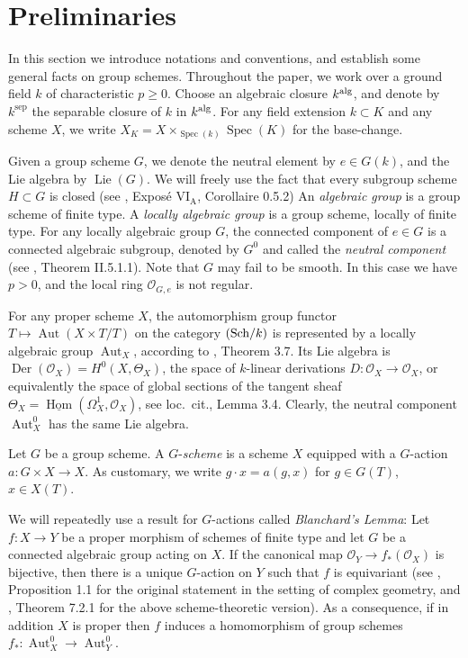 \documentclass[oneside, 12pt]{amsart}
\theoremstyle{definition}
\theoremstyle{remark}
\newcommand{\catO}{\mathcal{O}}
\newcommand{\alg}{\text{\rm alg}}
\newcommand{\Aut}{\operatorname{Aut}}
\newcommand{\Der}{\operatorname{Der}}
\newcommand{\Gal}{\operatorname{Gal}}
\newcommand{\Lie}{\operatorname{Lie}}
\renewcommand{\O}{\mathscr{O}}
\newcommand{\ra}{\rightarrow}
\newcommand{\sep}{{\operatorname{sep}}}
\newcommand{\Sch}{\text{\rm Sch}}
\newcommand{\Spec}{\operatorname{Spec}}
\newcommand{\uHom}{\underline{\operatorname{Hom}}}
\begin{document}
\section{Preliminaries}
\label{sec:prel}

In this section we introduce notations and conventions, and establish
some general facts on group schemes. Throughout the paper, 
we work over a ground field $k$ of characteristic $p\geq 0$.
Choose an algebraic closure $k^{\alg}$,
and denote by $k^{\sep}$ the separable closure
of $k$ in $k^{\alg}$.
For any field extension $k\subset K$ and any  scheme $X$, we write 
$X_K=X \times_{\Spec(k)} \Spec(K)$ for the base-change.

Given a group scheme $G$, we denote the
neutral element by $e  \in G(k)$,
and the Lie algebra by $\Lie(G)$.
We will freely use the fact that every
subgroup scheme  $H\subset G$ is closed
(see \cite{SGA 3a}, Expos\'e $\text{VI}_\text{A}$,  Corollaire 0.5.2)
An \emph{algebraic group} is a group scheme
of finite type. A \emph{locally algebraic group} 
is a group scheme, locally of finite type. 
For any locally algebraic group $G$, the connected 
component of $e\in G$ is a connected algebraic subgroup, 
denoted by $G^0$ and called the \emph{neutral component} 
(see \cite {Demazure; Gabriel 1970}, Theorem II.5.1.1).
Note that $G$ may fail to be smooth. In this case we have  $p>0$,
and the local ring $\O_{G,e}$ is not regular.

For any proper scheme $X$, the automorphism group
functor $T \mapsto \Aut(X \times T/T)$ on the category $(\Sch/k)$ is represented
by a locally algebraic group $\Aut_X$, according to 
\cite{Matsumura; Oort 1967}, Theorem 3.7. Its Lie algebra is  
$\Der(\catO_X)=H^0(X,\Theta_X)$, the space of $k$-linear 
derivations $D :\O_X\ra \O_X$,
or equivalently the space of global sections of the tangent sheaf $\Theta_X=\uHom(\Omega^1_X,\O_X)$,
see loc.~cit., Lemma 3.4. 
Clearly, the neutral component $\Aut^0_X$ has the same Lie algebra.

Let $G$ be a group scheme. A $G$-\emph{scheme} 
is a scheme $X$ equipped with a $G$-action 
$a : G \times X \to X$.
As customary, we write $ g\cdot x= a(g,x) $  for  
$g \in G(T)$, $x \in X(T)$.

We will repeatedly use a result for $G$-actions called
\emph{Blanchard's Lemma}: Let $f: X \to Y$ be a proper morphism
of schemes of finite type and let $G$ be a connected algebraic
group acting on $X$. If the canonical map $\catO_Y \to f_*(\catO_X)$ 
is bijective, then there is a unique $G$-action on $Y$ such that
$f$ is equivariant (see \cite{Blanchard 1956}, Proposition 1.1 
for the original statement in the setting of complex geometry, 
and \cite{Brion 2017}, Theorem 7.2.1 for the above scheme-theoretic 
version). As a consequence, if in addition $X$ is proper 
then $f$ induces a homomorphism of group schemes 
$f_* : \Aut^0_X \to \Aut^0_Y$.
\end{document}
